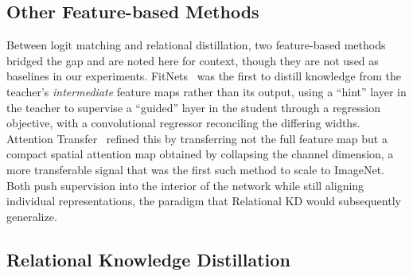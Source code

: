 \documentclass[11pt,letterpaper]{article}
\begin{document}
\subsection{Other Feature-based Methods}
\label{sec:kd-feature}

Between logit matching and relational distillation, two feature-based methods
bridged the gap and are noted here for context, though they are not used as
baselines in our experiments. FitNets~\cite{romero2015fitnets} was the first to
distill knowledge from the teacher's \emph{intermediate} feature maps rather than
its output, using a ``hint'' layer in the teacher to supervise a ``guided'' layer
in the student through a regression objective, with a convolutional regressor
reconciling the differing widths. Attention Transfer~\cite{zagoruyko2017attention}
refined this by transferring not the full feature map but a compact spatial
attention map obtained by collapsing the channel dimension, a more transferable
signal that was the first such method to scale to ImageNet. Both push supervision
into the interior of the network while still aligning individual representations,
the paradigm that Relational KD would subsequently generalize.

\subsection{Relational Knowledge Distillation}
\label{sec:kd-rkd}
\end{document}
